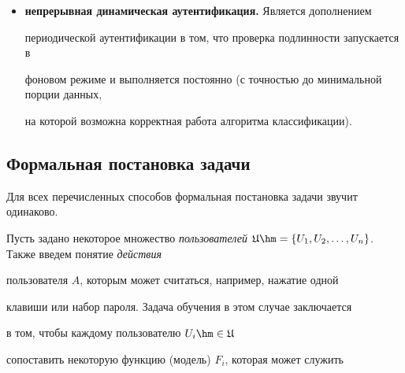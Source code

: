 \begin{multicols}{2}
\begin{itemize}
    сессии работы с системой. В~данном случае процесс проверки пользователя\linebreak \mbox{может} 

    запускаться по какому-либо событию, например по времени или при обнаружении 

    потенциально подозрительной активности. Собранные в рамках сессии данные сравниваются с поведением пользователя в предшествующих сессиях для выявления аномалий. Данный метод имеет ряд преимуществ перед статическим анализом. Во-первых, набираемый текст может быть произвольным -- анализируется только то, \textit{как} пользователь его набирает. Во-вторых, такие данные значительно проще собрать: в общем случае они собираются в фоновом режиме при обычной работе пользователя. Таким образом обучить систему значительно проще и, кроме того, на большом массиве данных даже у неопытного пользователя проще выделить характерные признаки;

    \item \textbf{непрерывная динамическая аутентификация.} Является дополнением 

    периодической аутентификации в том, что проверка подлинности запускается в 

    фоновом режиме и выполняется постоянно (с точностью до минимальной порции данных, 

    на которой возможна корректная работа алгоритма классификации).

\end{itemize}



\subsection{Формальная постановка задачи}

Для всех перечисленных способов формальная постановка задачи звучит одинаково.



Пусть задано некоторое множество {\it пользователей} $ \mathfrak{U}

\hm= \{U_1, U_2, \ldots , U_n\}$. Также введем понятие {\it действия}

пользователя $A$, которым может считаться, например, нажатие одной

клавиши или набор пароля. Задача обучения в этом случае заключается

в том, чтобы  каждому пользователю $U_i\hm \in \mathfrak{U} $

сопоставить некоторую функцию (модель) $F_i$, которая может служить


\end{multicols}
